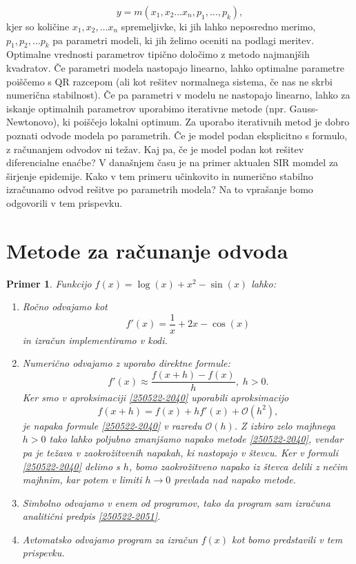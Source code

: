 \documentclass[12pt,slovene]{article}
\newtheorem{primer}{Primer}
\begin{document}
$$ y = m(x_1, x_2\ldots x_n, p_1, \ldots, p_k),$$
kjer so količine $x_1, x_2, \ldots x_n$ spremeljivke, ki jih lahko neposredno merimo, $p_1, p_2, \ldots p_k$ pa parametri modeli, ki jih želimo oceniti na podlagi meritev. Optimalne vrednosti parametrov tipično določimo z metodo najmanjših kvadratov. Če parametri modela nastopajo linearno, lahko optimalne parametre poiščemo s QR razcepom (ali kot rešitev normalnega sistema, če nas ne skrbi numerična stabilnost). Če pa parametri v modelu ne nastopajo linearno, lahko za iskanje optimalnih parametrov uporabimo iterativne metode (npr. Gauss-Newtonovo), ki poiščejo lokalni optimum. Za uporabo iterativnih metod je dobro poznati odvode modela po parametrih. Če je model podan eksplicitno s formulo, z računanjem odvodov ni težav. Kaj pa, če je model podan kot rešitev diferencialne enaćbe? V današnjem času je na primer aktualen SIR momdel za širjenje epidemije. Kako v tem primeru učinkovito in numerično stabilno izračunamo odvod rešitve po parametrih modela? Na to vprašanje bomo odgovorili v tem prispevku.

\section{Metode za računanje odvoda}

\begin{primer}\label{250522-2103}
Funkcijo $f(x)=\log(x)+x^2-\sin(x)$ lahko:
\begin{enumerate}
\item Ročno odvajamo kot 
    \begin{equation}\label{250522-2051}
        f'(x)=\frac{1}{x}+2x-\cos(x)
    \end{equation}
        in izračun implementiramo v kodi. 
\item Numerično odvajamo z uporabo \textit{direktne     
    formule}:
    \begin{equation}\label{250522-2040}
        f'(x)\approx \frac{f(x+h)-f(x)}{h},\; h>0.
    \end{equation}
    Ker smo v aproksimaciji \eqref{250522-2040} uporabili aproksimacijo 
        $$f(x+h)=f(x)+hf'(x)+\mathcal{O}(h^2),$$
    je napaka formule \eqref{250522-2040} v razredu $\mathcal{O}(h)$. Z izbiro zelo majhnega $h>0$ tako lahko poljubno zmanjšamo napako metode \eqref{250522-2040}, vendar pa je težava v zaokrožitvenih napakah, ki nastopajo v števcu. Ker v formuli \eqref{250522-2040} delimo s $h$, bomo zaokrožitveno napako iz števca delili z nečim majhnim, kar potem v limiti $h\to 0$ prevlada nad napako metode.
\item Simbolno odvajamo v enem od programov, tako da program sam izračuna analitični predpis 
    \eqref{250522-2051}.
\item Avtomatsko odvajamo program za izračun $f(x)$ kot bomo predstavili v tem prispevku.
\end{enumerate}
\end{primer}
\end{document}
